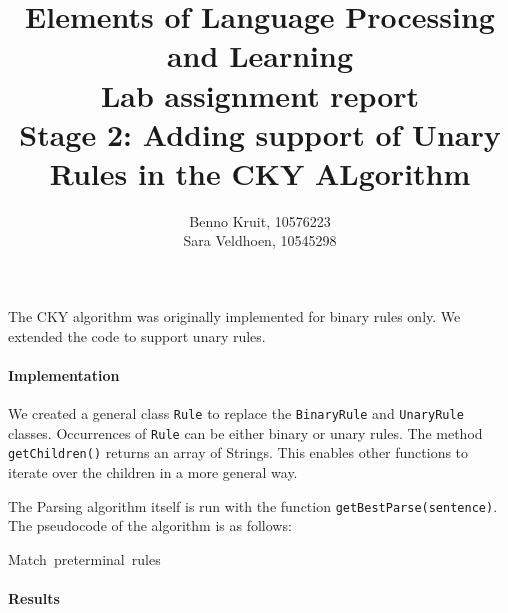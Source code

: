 \documentclass{article}
\title{Elements of Language Processing and Learning\\
Lab assignment report\\
Stage 2: Adding support of Unary Rules in the CKY ALgorithm}
\author{Benno Kruit, 10576223\\Sara Veldhoen, 10545298}
\begin{document}
\maketitle

The CKY algorithm was originally implemented for binary rules only. We extended the code to support unary rules.
\paragraph{Implementation}
We created a general class {\tt Rule} to replace the {\tt BinaryRule} and {\tt UnaryRule} classes. Occurrences of {\tt Rule} can be either binary or unary rules. The method {\tt getChildren()} returns an array of Strings. This enables other functions to iterate over the children in a more general way.

The Parsing algorithm itself is run with the function {\tt getBestParse(sentence)}. The pseudocode of the algorithm is as follows:

\begin{program}
\mbox{Match preterminal rules}

\end{program}


\paragraph{Results}
\end{document}

